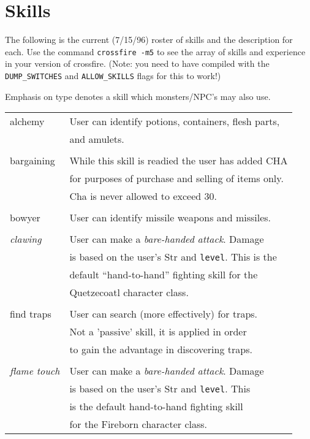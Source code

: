 \chapter{Skills}
\label{app:skills}

The following is the current (7/15/96) roster of skills and the
description for each. Use the command {\tt crossfire -m5} to see the array
of skills and experience in your version of crossfire.
(Note: you need to have compiled with the {\tt DUMP\_SWITCHES} and
{\tt ALLOW\_SKILLS} flags for this to work!)
 
Emphasis on type denotes a skill which monsters/NPC's may also use.
 
\begin{longtable}{|p{4cm}|p{9cm}|} \hline
alchemy &  User can identify potions, containers, flesh parts, \\ 
	&  and amulets. \\ 
 &  \\
bargaining   	& While this skill is readied the user has added CHA \\ 
	 	& for purposes of purchase and selling of items only. \\ 
		& Cha is never allowed to exceed 30. \\ 
 &  \\
bowyer  &  User can identify missile weapons and missiles. \\ 
 &  \\
{\em clawing}	& User can make a {\em bare-handed attack}. Damage \\ 
                & is based on the user's Str and {\tt level}. This is the \\ 
		& default ``hand-to-hand'' fighting skill for the  \\
		& Quetzecoatl character class. \\
 &  \\
find traps	& User can search (more effectively) for traps. \\ 
		& Not a 'passive' skill, it is applied in order \\ 
		& to gain the advantage in discovering traps. \\ 
 &  \\
{\em flame touch} & User can make a {\em bare-handed attack}. Damage \\ 
		& is based on the user's Str and {\tt level}. This \\ 
		& is the default hand-to-hand fighting skill \\ 
		& for the Fireborn character class. \\ 

\end{longtable}
